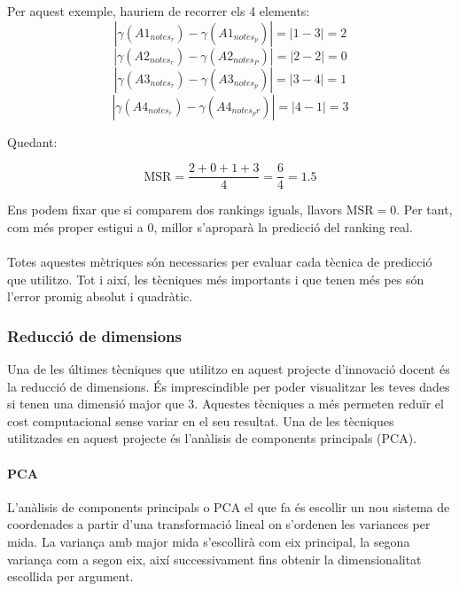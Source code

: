 \documentclass[12pt,a4paper,catalan]{article}
\begin{document}
Per aquest exemple, hauriem de recorrer els 4 elements:
	$$\left|\gamma(A1_{notes_r}) - \gamma(A1_{notes_p})\right| = \left| 1 - 3 \right| = 2$$
	$$\left|\gamma(A2_{notes_r}) - \gamma(A2_{notes_P})\right| = \left| 2 - 2 \right| = 0$$
	$$\left|\gamma(A3_{notes_r}) - \gamma(A3_{notes_p})\right| = \left| 3 - 4 \right| = 1$$
	$$\left|\gamma(A4_{notes_r}) - \gamma(A4_{notes_pr})\right| = \left| 4 - 1 \right| = 3$$

Quedant:

$$ \mathrm{MSR} = \frac{2 + 0 + 1 + 3}{4} = \frac{6}{4} = 1.5$$

Ens podem fixar que si comparem dos rankings iguals, llavors $\mathrm{MSR} = 0$. Per tant, com més proper estigui a 0, millor s'aproparà la predicció del ranking real.
\\
\\
Totes aquestes mètriques són necessaries per evaluar cada tècnica de predicció que utilitzo. Tot i així, les tècniques més importants i que tenen més pes són l'error promig absolut i quadràtic.

\subsubsection{Reducció de dimensions}
Una de les últimes tècniques que utilitzo en aquest projecte d'innovació docent és la reducció de dimensions. És imprescindible per poder visualitzar les teves dades si tenen una dimensió major que 3. Aquestes tècniques a més permeten reduïr el cost computacional sense variar en el seu resultat. Una de les tècniques utilitzades en aquest projecte és l'anàlisis de components principals (PCA).

\paragraph{PCA}
L'anàlisis de components principals o PCA el que fa és escollir un nou sistema de coordenades a partir d'una transformació lineal on s'ordenen les variances per mida. La variança amb major mida s'escollirà com eix principal, la segona variança com a segon eix, així successivament fins obtenir la dimensionalitat escollida per argument.

\newpage
\end{document}

